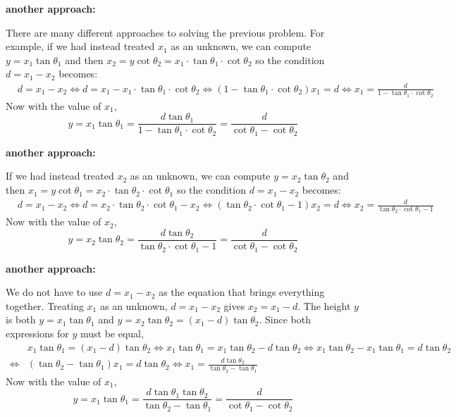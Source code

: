\documentclass{article}
\begin{document}
\vspace{5mm}

\textbf{another approach:}

There are many different approaches to solving the previous problem. For example, if we had instead treated \(x_1\) as an unknown, we can compute \(y = x_1\tan\theta_1\) and then \(x_2 = y\cot\theta_2 = x_1 \cdot \tan\theta_1 \cdot \cot\theta_2\) so the condition \(d = x_1 - x_2\) becomes: 
\begin{align*}
& d = x_1 - x_2 
\iff d = x_1 - x_1 \cdot \tan\theta_1 \cdot \cot\theta_2 
\iff (1 - \tan\theta_1 \cdot \cot\theta_2)x_1 = d 
\iff x_1 = \frac{d}{1 - \tan\theta_1 \cdot \cot\theta_2} 
\end{align*}
Now with the value of \(x_1\), 
\[y = x_1\tan\theta_1 = \frac{d\tan\theta_1}{1 - \tan\theta_1 \cdot \cot\theta_2} = \frac{d}{\cot\theta_1 - \cot\theta_2}\]

\vspace{5mm}

\textbf{another approach:}

If we had instead treated \(x_2\) as an unknown, we can compute \(y = x_2\tan\theta_2\) and then \(x_1 = y\cot\theta_1 = x_2 \cdot \tan\theta_2 \cdot \cot\theta_1\) so the condition \(d = x_1 - x_2\) becomes: 
\begin{align*}
& d = x_1 - x_2 
\iff d = x_2 \cdot \tan\theta_2 \cdot \cot\theta_1 - x_2
\iff (\tan\theta_2 \cdot \cot\theta_1 - 1)x_2 = d 
\iff x_2 = \frac{d}{\tan\theta_2 \cdot \cot\theta_1 - 1} 
\end{align*}
Now with the value of \(x_2\), 
\[y = x_2\tan\theta_2 = \frac{d\tan\theta_2}{\tan\theta_2 \cdot \cot\theta_1 - 1} = \frac{d}{\cot\theta_1 - \cot\theta_2}\]

\vspace{5mm}

\textbf{another approach:}

We do not have to use \(d = x_1 - x_2\) as the equation that brings everything together. Treating \(x_1\) as an unknown, \(d = x_1 - x_2\) gives \(x_2 = x_1 - d\). The height \(y\) is both \(y = x_1\tan\theta_1\) and \(y = x_2\tan\theta_2 = (x_1 - d)\tan\theta_2\). Since both expressions for \(y\) must be equal, 
\begin{align*}
& x_1\tan\theta_1 = (x_1 - d)\tan\theta_2 
\iff x_1\tan\theta_1 = x_1\tan\theta_2 - d\tan\theta_2 
\iff x_1\tan\theta_2 - x_1\tan\theta_1 = d\tan\theta_2 \\
\iff & (\tan\theta_2 - \tan\theta_1)x_1 = d\tan\theta_2 
\iff x_1 = \frac{d\tan\theta_2}{\tan\theta_2 - \tan\theta_1}
\end{align*}  
Now with the value of \(x_1\), 
\[y = x_1\tan\theta_1 = \frac{d \tan\theta_1 \tan\theta_2}{\tan\theta_2 - \tan\theta_1} = \frac{d}{\cot\theta_1 - \cot\theta_2}\]
\end{document}
